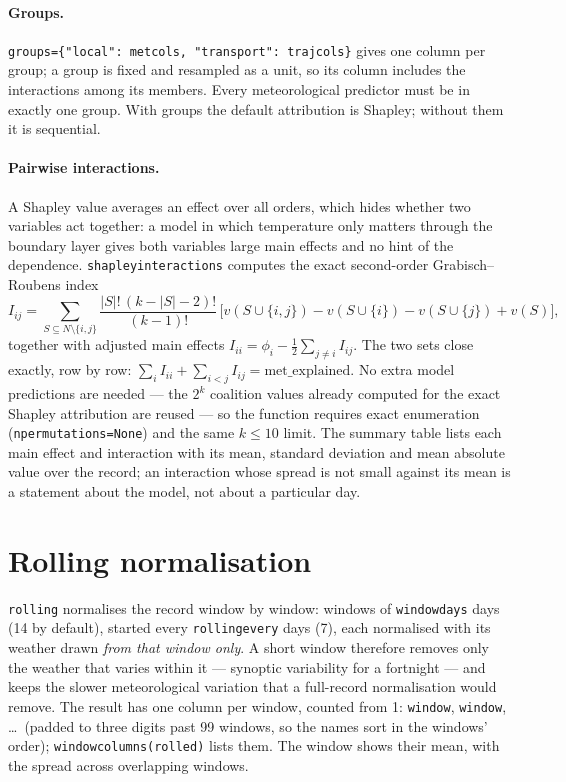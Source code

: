 \documentclass[11pt]{report}
\newcommand{\codeunderscore}{\textunderscore\allowbreak}
\newcommand{\code}[1]{\texttt{\let\_\codeunderscore #1}}
\begin{document}
\paragraph{Groups.} \code{groups=\{"local": met\_cols, "transport": traj\_cols\}} gives one
column per group; a group is fixed and resampled as a unit, so its column includes the
interactions among its members. Every meteorological predictor must be in exactly one
group. With groups the default attribution is Shapley; without them it is sequential.

\paragraph{Pairwise interactions.} A Shapley value averages an effect over all orders,
which hides whether two variables act together: a model in which temperature only
matters through the boundary layer gives both variables large main effects and no hint
of the dependence. \code{shapley\_interactions} computes the exact second-order
Grabisch--Roubens index
\begin{equation}
  I_{ij} = \sum_{S \subseteq N\setminus\{i,j\}}
    \frac{|S|!\,(k-|S|-2)!}{(k-1)!}\,
    \bigl[v(S\cup\{i,j\}) - v(S\cup\{i\}) - v(S\cup\{j\}) + v(S)\bigr],
\end{equation}
together with adjusted main effects $I_{ii} = \phi_i - \tfrac12\sum_{j\ne i} I_{ij}$.
The two sets close exactly, row by row:
$\sum_i I_{ii} + \sum_{i<j} I_{ij} = \text{met\_explained}$. No extra model
predictions are needed --- the $2^k$ coalition values already computed for the exact
Shapley attribution are reused --- so the function requires exact enumeration
(\code{n\_permutations=None}) and the same $k \le 10$ limit. The summary table lists
each main effect and interaction with its mean, standard deviation and mean absolute
value over the record; an interaction whose spread is not small against its mean is a
statement about the model, not about a particular day.

\section{Rolling normalisation}\label{sec:rolling}
\code{rolling} normalises the record window by window: windows of \code{window\_days}
days (14 by default), started every \code{rolling\_every} days (7), each normalised with
its weather drawn \emph{from that window only}. A short window therefore removes only the
weather that varies within it --- synoptic variability for a fortnight --- and keeps the
slower meteorological variation that a full-record normalisation would remove. The result
has one column per window, counted from 1: \code{window\_01}, \code{window\_02}, \dots\
(padded to three digits past 99 windows, so the names sort in the windows' order);
\code{window\_columns(rolled)} lists them. The window shows their mean, with the spread
across overlapping windows.
\end{document}
